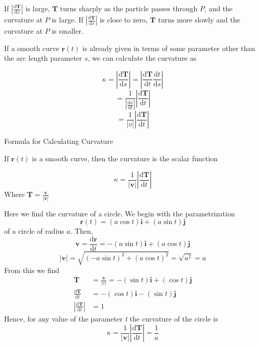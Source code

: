 \documentclass[12pt,a4paper]{article}
\newenvironment{ruleBox}[1]{\begin{rulebox}{#1}}{\end{rulebox}\vspace{1\baselineskip}}
\begin{document}
If $\left|\frac{\mathrm{d}\mathbf{T}}{\mathrm{d}s}\right|$ is large, $\mathbf{T}$ turns sharply as the particle passes through $P$, and the curvature at $P$ is large. If $\left|\frac{\mathrm{d}\mathbf{T}}{\mathrm{d}s}\right|$ is close to zero, $\mathbf{T}$ turns more slowly and the curvature at $P$ is smaller.

If a smooth curve $\mathbf{r}(t)$ is already given in terms of some parameter other than the arc length parameter $s$, we can calculate the curvature as

\[\kappa = \left|\frac{\mathrm{d}\mathbf{T}}{\mathrm{d}s}\right| = \left|\frac{\mathrm{d}\mathbf{T}}{\mathrm{d}t}\frac{\mathrm{d}t}{\mathrm{d}s}\right|\]
\[= \frac{1}{\left|\frac{\mathrm{d}s}{\mathrm{d}t}\right|}\left|\frac{\mathrm{d}\mathbf{T}}{\mathrm{d}t}\right|\]
\[= \frac{1}{|v|}\left|\frac{\mathrm{d}\mathbf{T}}{\mathrm{d}t}\right|\]


\begin{ruleBox}{Formula for Calculating Curvature}

  If \(\mathbf{r}(t)\) is a smooth curve, then the curvature is the scalar function

  \[\kappa = \frac{1}{|\mathbf{v}|}\left|\frac{\mathrm{d}\mathbf{T}}{\mathrm{d}t}\right|\]
  Where \(\mathbf{T} = \frac{\mathbf{v}}{|\mathbf{v}|}\)  
\end{ruleBox}
\newpage

\begin{example}
  Here we find the curvature of a circle. We begin with the parametrization
  \[\mathbf{r}(t) = (a \cos t)\mathbf{i} + (a \sin t)\mathbf{j}\]
  of a circle of radius \(a\). Then,
  \[\mathbf{v} = \frac{\mathrm{d}\mathbf{r}}{\mathrm{d}t} = -(a \sin t)\mathbf{i} + (a \cos t)\mathbf{j}\]
  \[|\mathbf{v}| = \sqrt{(-a \sin t)^2 + (a \cos t)^2} = \sqrt{a^2} = a\]
  From this we find
\begin{align*}
  \mathbf{T} &= \frac{\mathbf{v}}{|v|} = -(\sin t)\mathbf{i} + (\cos t)\mathbf{j}\\
  \frac{\mathrm{d}\mathbf{T}}{\mathrm{d}t} &= -(\cos t)\mathbf{i} - (\sin t)\mathbf{j} \\
  \left|\frac{\mathrm{d}\mathbf{T}}{\mathrm{d}t}\right| &= 1
\end{align*}
Hence, for any value of the parameter \textit{t} the curvature of the circle is
\[\kappa = \frac{1}{|\mathbf{v}|}\left|\frac{\mathrm{d}\mathbf{T}}{\mathrm{d}t}\right| = \frac{1}{a}\]

\end{example}
\end{document}
